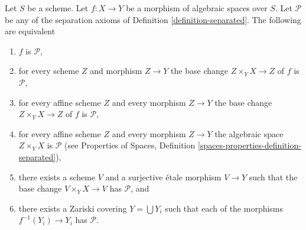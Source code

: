 \begin{lemma}
\label{lemma-separated-local}
Let $S$ be a scheme.
Let $f : X \to Y$ be a morphism of algebraic spaces over $S$.
Let $\mathcal{P}$ be any of the separation
axioms of Definition \ref{definition-separated}.
The following are equivalent
\begin{enumerate}
\item $f$ is $\mathcal{P}$,
\item for every scheme $Z$ and morphism $Z \to Y$ the
base change $Z \times_Y X \to Z$ of $f$ is $\mathcal{P}$,
\item for every affine scheme $Z$ and every morphism $Z \to Y$ the
base change $Z \times_Y X \to Z$ of $f$ is $\mathcal{P}$,
\item for every affine scheme $Z$ and every morphism $Z \to Y$ the
algebraic space $Z \times_Y X$ is $\mathcal{P}$ (see
Properties of Spaces, Definition \ref{spaces-properties-definition-separated}),
\item there exists a scheme $V$ and a surjective \'etale morphism
$V \to Y$ such that the base change $V \times_Y X \to V$ has
$\mathcal{P}$, and
\item there exists a Zariski covering $Y = \bigcup Y_i$ such that each
of the morphisms $f^{-1}(Y_i) \to Y_i$ has $\mathcal{P}$.
\end{enumerate}
\end{lemma}

